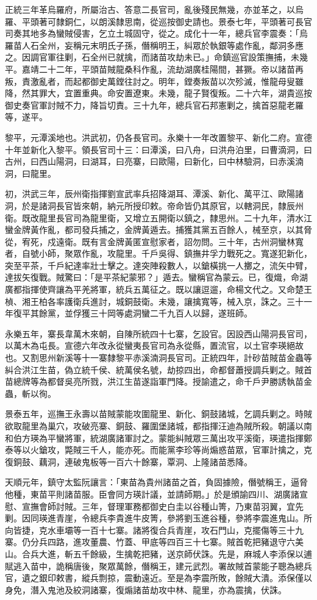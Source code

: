 \begin{pinyinscope}
正統三年革烏羅府，所屬治古、答意二長官司，亂後殘民無幾，亦並革之，以烏羅、平頭著可隸銅仁，以朗溪隸思南，從巡按御史請也。景泰七年，平頭著可長官司奏其地多為蠻賊侵害，乞立土城固守，從之。成化十一年，總兵官李震奏：「烏羅苗人石全州，妄稱元末明氏子孫，僭稱明王，糾眾於執銀等處作亂，鄰洞多應之。因調官軍往剿，石全州已就擒，而諸苗攻劫未已。」命鎮巡官設策撫捕，未幾平。嘉靖二十二年，平頭苗賊龍桑科作亂，流劫湖廣桂陽間，甚獗。帝以諸苗再叛，責激亂者，而起都御史萬鏜往討之。明年，鏜奏叛苗以次殄滅，惟龍母叟雖降，然其罪大，宜置重典。命安置遼東。未幾，龍子賢復叛。二十六年，湖貴巡按御史奏官軍討賊不力，降旨切責。三十九年，總兵官石邦憲剿之，擒首惡龍老羅等，遂平。

黎平，元潭溪地也。洪武初，仍各長官司。永樂十一年改置黎平、新化二府。宣德十年並新化入黎平。領長官司十三：曰潭溪，曰八舟，曰洪舟泊里，曰曹滴洞，曰古州，曰西山陽洞，曰湖耳，曰亮寨，曰歐陽，曰新化，曰中林驗洞，曰赤溪湳洞，曰龍里。

初，洪武三年，辰州衛指揮劉宣武率兵招降湖耳、潭溪、新化、萬平江、歐陽諸洞，於是諸洞長官皆來朝，納元所授印敕。帝命皆仍其原官，以轄洞民，隸辰州衛。既改龍里長官司為龍里衛，又增立五開衛以鎮之，隸思州。二十九年，清水江蠻金牌黃作亂，都司發兵捕之，金牌黃遁去。捕獲其黨五百餘人，械至京，以其脅從，宥死，戍遠衛。既有言金牌黃匿宣慰家者，詔勿問。三十年，古州洞蠻林寬者，自號小師，聚眾作亂，攻龍里。千戶吳得、鎮撫井孚力戰死之。寬遂犯新化，突至平茶，千戶紀達率壯士擊之。達突陣殺數人，以鎗橫挑一人擲之，流矢中臂，達拔矢復戰。賊驚曰：「是平茶紀蒙邪？」遁去。蠻稱官為蒙云。已，復熾，命湖廣都指揮使齊讓為平羌將軍，統兵五萬征之。既以讓逗遛，命楊文代之。又命楚王楨、湘王柏各率護衛兵進討，城銅鼓衛。未幾，讓擒寬等，械入京，誅之。三十一年復平其餘黨，並俘獲三十岡等處洞蠻二千九百人以歸，遂班師。

永樂五年，寨長韋萬木來朝，自陳所統四十七寨，乞設官。因設西山陽洞長官司，以萬木為屯長。宣德六年改永從蠻夷長官司為永從縣，置流官，以土官李瑛絕故也。又割思州新溪等十一寨隸黎平赤溪湳洞長官司。正統四年，計砂苗賊苗金蟲等糾合洪江生苗，偽立統千侯、統萬侯名號，劫掠四出，命都督蕭授調兵剿之。賊首苗總牌等為都督吳亮所戮，洪江生苗遂詣軍門降。授諭遣之，命千戶尹勝誘執苗金蟲，斬以徇。

景泰五年，巡撫王永壽以苗賊蒙能攻圍龍里、新化、銅鼓諸城，乞調兵剿之。時賊欲取龍里為巢穴，攻破亮寨、銅鼓、羅圍堡諸城，都指揮汪迪為賊所殺。朝議以南和伯方瑛為平蠻將軍，統湖廣諸軍討之。蒙能糾賊眾三萬出攻平溪衛，瑛遣指揮鄭泰等以火鎗攻，斃賊三千人，能亦死。而能黨李珍等尚煽惑苗眾，官軍計擒之，克復銅鼓、藕洞，連破鬼板等一百六十餘寨，覃洞、上隆諸苗悉降。

天順元年，鎮守太監阮讓言：「東苗為貴州諸苗之首，負固據險，僭號稱王，逼脅他種，東苗平則諸苗服。臣會同方瑛計議，並請師期。」於是頒諭四川、湖廣諸宣慰、宣撫會師討賊。三年，督理軍務都御史白圭以谷種山箐，乃東苗羽翼，宜先剿。因同瑛進青崖，令總兵李貴進牛皮箐，參將劉玉進谷種，參將李震進鬼山。所向皆捷，克水車壩等一百十七寨。諸將復合兵青崖，攻石門山，克擺傷等三十九寨。仍分兵四路，進攻董農、竹蓋、甲底等四百三十七寨。賊首乾把豬退守六美山。合兵大進，斬五千餘級，生擒乾把豬，送京師伏誅。先是，麻城人李添保以逋賦逃入苗中，詭稱唐後，聚眾萬餘，僭稱王，建元武烈。署故賊首蒙能子聰為總兵官，遺之銀印敕書，縱兵剽掠，震動遠近。至是為李震所敗，餘賊大潰。添保僅以身免，潛入鬼池及絞洞諸寨，復煽諸苗劫攻中林、龍里，亦為震擒，伏誅。


\end{pinyinscope}
